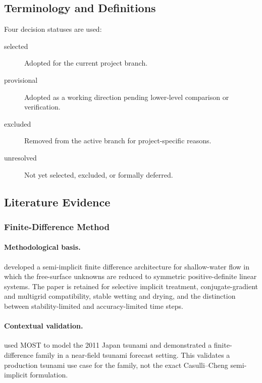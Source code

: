 \subsection{Terminology and Definitions}
\label{sec:res-num-frm-definitions}

Four decision statuses are used:

\begin{description}
  \item[selected] Adopted for the current project branch.
  \item[provisional] Adopted as a working direction pending lower-level
    comparison or verification.
  \item[excluded] Removed from the active branch for project-specific
    reasons.
  \item[unresolved] Not yet selected, excluded, or formally deferred.
\end{description}

\subsection{Literature Evidence}
\label{sec:res-num-frm-literature-evidence}

%

\subsubsection{Finite-Difference Method}
\label{sec:res-num-frm-evidence-fdm}

\paragraph{Methodological basis.}
\textcite{casulli1992semiimplicit} developed a semi-implicit finite
difference architecture for shallow-water flow in which the free-surface
unknowns are reduced to symmetric positive-definite linear systems. The
paper is retained for selective implicit treatment, conjugate-gradient
and multigrid compatibility, stable wetting and drying, and the
distinction between stability-limited and accuracy-limited time steps.

\paragraph{Contextual validation.}
\textcite{wei2013japan} used MOST to model the 2011 Japan tsunami and
demonstrated a finite-difference family in a near-field tsunami
forecast setting. This validates a production tsunami use case for the
family, not the exact Casulli--Cheng semi-implicit formulation.

